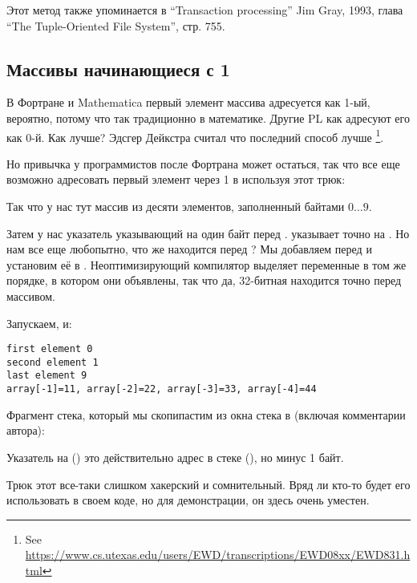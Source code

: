 Этот метод также упоминается в ``Transaction processing'' Jim Gray, 1993,
глава ``The Tuple-Oriented File System'', стр. 755.

\subsection{Массивы начинающиеся с 1}

В Фортране и Mathematica первый элемент массива адресуется как 1-ый, вероятно, потому что так традиционно в математике.
Другие \ac{PL} как \CCpp адресуют его как 0-й.
Как лучше?
Эдсгер Дейкстра считал что последний способ лучше
\footnote{See \url{https://www.cs.utexas.edu/users/EWD/transcriptions/EWD08xx/EWD831.html}}.

Но привычка у программистов после Фортрана может остаться, так что все еще возможно адресовать
первый элемент через 1 в \CCpp используя этот трюк:





Так что у нас тут массив  из десяти элементов, заполненный байтами $0 \ldots 9$.

Затем у нас указатель  указывающий на один байт перед .
 указывает точно на .
Но нам все еще любопытно, что же находится перед ?
Мы добавляем  перед  и установим её в .
Неоптимизирующий компилятор выделяет переменные в том же порядке, в котором они 
объявлены, так что да, 32-битная  находится точно перед массивом.

Запускаем, и:

\begin{lstlisting}
first element 0
second element 1
last element 9
array[-1]=11, array[-2]=22, array[-3]=33, array[-4]=44
\end{lstlisting}

Фрагмент стека, который мы скопипастим из окна стека в \olly (включая комментарии автора):



Указатель на  () это действительно адрес  в стеке (), 
но минус 1 байт.

Трюк этот все-таки слишком хакерский и сомнительный. Вряд ли кто-то будет его использовать в своем коде,
но для демонстрации, он здесь очень уместен.

